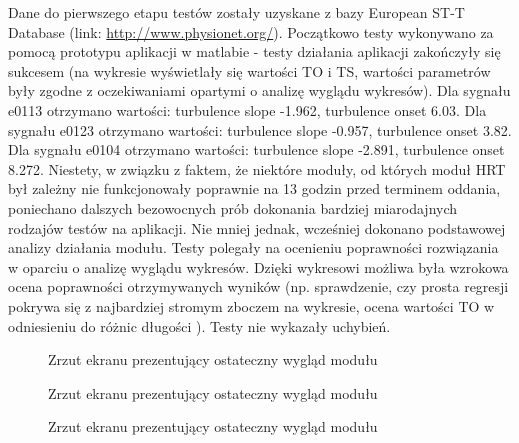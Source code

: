 \documentclass[a4paper, 11pt]{article}
\begin{document}
Dane do pierwszego etapu testów zostały uzyskane z bazy European ST-T Database (link: \url{http://www.physionet.org/}).
Początkowo testy wykonywano za pomocą prototypu aplikacji w matlabie - testy działania aplikacji zakończyły się sukcesem 
(na wykresie wyświetlały się wartości TO i TS, wartości parametrów były zgodne z oczekiwaniami opartymi o analizę
wyglądu wykresów). 
Dla sygnału e0113 otrzymano wartości: turbulence slope -1.962, turbulence onset 6.03.
Dla sygnału e0123 otrzymano wartości: turbulence slope -0.957, turbulence onset 3.82.
Dla sygnału e0104 otrzymano wartości: turbulence slope -2.891, turbulence onset 8.272.
Niestety, w związku z faktem, że niektóre moduły, od których moduł HRT był zależny nie funkcjonowały
poprawnie na 13 godzin przed terminem oddania, poniechano dalszych bezowocnych prób dokonania bardziej miarodajnych
rodzajów testów na aplikacji. Nie mniej jednak, wcześniej dokonano podstawowej analizy działania modułu.
Testy polegały na ocenieniu poprawności rozwiązania w oparciu o analizę wyglądu wykresów. Dzięki wykresowi możliwa była
wzrokowa ocena poprawności otrzymywanych wyników (np. sprawdzenie, czy prosta regresji pokrywa się z najbardziej stromym zboczem
na wykresie, ocena wartości TO w odniesieniu do różnic długości ). Testy nie wykazały uchybień. 
\begin{figure}[h!]
\centering
\caption{Zrzut ekranu prezentujący ostateczny wygląd modułu} 
\end{figure}

\begin{figure}[h!]
\centering
\caption{Zrzut ekranu prezentujący ostateczny wygląd modułu} 
\end{figure}

\begin{figure}[h!]
\centering
\caption{Zrzut ekranu prezentujący ostateczny wygląd modułu} 
\end{figure}



\end{document}
